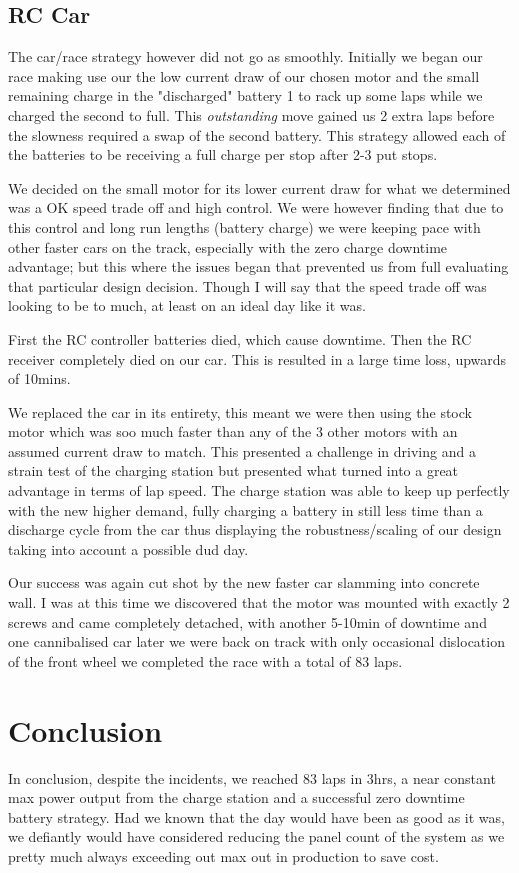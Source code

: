 \documentclass[11pt]{article}
\begin{document}
\subsection*{RC Car}
The car/race strategy however did not go as smoothly. Initially we began our race making use our the low current draw of our chosen motor and the small remaining charge in the "discharged" battery 1 to rack up some laps while we charged the second to full. This \textit{outstanding} move gained us 2 extra laps before the slowness required a swap of the second battery. This strategy allowed each of the batteries to be receiving a full charge per stop after 2-3 put stops.

We decided on the small motor for its lower current draw for what we determined was a OK speed trade off and high control. We were however finding that due to this control and long run lengths (battery charge) we were keeping pace with other faster cars on the track, especially with the zero charge downtime advantage; but this where the issues began that prevented us from full evaluating that particular design decision. Though I will say that the speed trade off was looking to be to much, at least on an ideal day like it was.

First the RC controller batteries died, which cause downtime. Then the RC receiver completely died on our car. This is resulted in a large time loss, upwards of 10mins. 

We replaced the car in its entirety, this meant we were then using the stock motor which was soo much faster than any of the 3 other motors with an assumed current draw to match. This presented a challenge in driving and a strain test of the charging station but presented what turned into a great advantage in terms of lap speed. The charge station was able to keep up perfectly with the new higher demand, fully charging a battery in still less time than a discharge cycle from the car thus displaying the robustness/scaling of our design taking into account a possible dud day. 

Our success was again cut shot by the new faster car slamming into concrete wall. I was at this time we discovered that the motor was mounted with exactly 2 screws and came completely detached, with another 5-10min of downtime and one cannibalised car later we were back on track with only occasional dislocation of the front wheel we completed the race with a total of 83 laps.


\section{Conclusion}
In conclusion, despite the incidents, we reached 83 laps in 3hrs, a near constant max power output from the charge station and a successful zero downtime battery strategy. 
Had we known that the day would have been as good as it was, we defiantly would have considered reducing the panel count of the system as we pretty much always exceeding out max out in production to save cost.  
\end{document}
